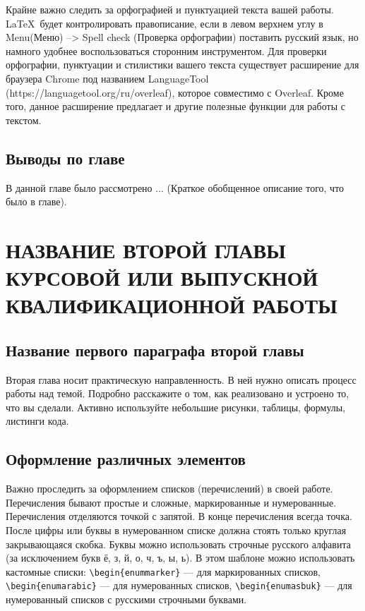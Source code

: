 \documentclass{report}
\begin{document}
Крайне важно следить за орфографией и пунктуацией текста вашей работы. \LaTeX\ будет контролировать правописание, если в левом верхнем углу в Menu(Меню) --> Spell check (Проверка орфографии) поставить русский язык, но намного удобнее воспользоваться сторонним инструментом. Для проверки орфографии, пунктуации и стилистики вашего текста существует расширение для браузера Chrome под названием LanguageTool (https://languagetool.org/ru/overleaf), которое совместимо с Overleaf. Кроме того, данное расширение предлагает и другие полезные функции для работы с текстом.

\section*{Выводы по главе}
В данной главе было рассмотрено ... (Краткое обобщенное описание того, что было в главе).


\chapter{НАЗВАНИЕ ВТОРОЙ ГЛАВЫ КУРСОВОЙ ИЛИ ВЫПУСКНОЙ КВАЛИФИКАЦИОННОЙ РАБОТЫ}
\setcounter{section}{0}
\setcounter{subsection}{0}
\setcounter{equation}{0}
\section{Название первого параграфа второй главы}

Вторая глава носит практическую направленность. В ней нужно описать процесс работы над темой. Подробно расскажите о том, как реализовано и устроено то, что вы сделали. Активно используйте небольшие рисунки, таблицы, формулы, листинги кода. 

\section{Оформление различных элементов}

Важно проследить за оформлением списков (перечислений) в своей работе. Перечисления бывают простые и сложные, маркированные и нумерованные. Перечисления отделяются точкой с запятой. В конце перечисления всегда точка. После цифры или буквы в нумерованном списке должна стоять только круглая закрывающаяся скобка. Буквы можно использовать строчные русского алфавита (за исключением букв ё, з, й, о, ч, ъ, ы, ь).
В этом шаблоне можно использовать кастомные списки: \verb|\begin{enummarker}| --- для маркированных списков, \break \verb|\begin{enumarabic}| --- для нумерованных списков, \verb|\begin{enumasbuk}| --- для нумерованный списков с русскими строчными буквами.
\end{document}
